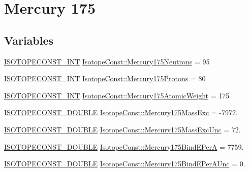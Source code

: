 \hypertarget{group___isotope_const-_mercury-_hg175}{}\section{Mercury 175}
\label{group___isotope_const-_mercury-_hg175}
\subsection*{Variables}
\begin{DoxyCompactItemize}
\item 
\mbox{\hyperlink{group___isotope_const-_macros_ga5f18360b3e99483a35c32d789e62621c}{I\+S\+O\+T\+O\+P\+E\+C\+O\+N\+S\+T\+\_\+\+I\+NT}} \mbox{\hyperlink{group___isotope_const-_mercury-_hg175_ga2373d2c730c026148d1260cc7efb0136}{Isotope\+Const\+::\+Mercury175\+Neutrons}} = 95
\item 
\mbox{\hyperlink{group___isotope_const-_macros_ga5f18360b3e99483a35c32d789e62621c}{I\+S\+O\+T\+O\+P\+E\+C\+O\+N\+S\+T\+\_\+\+I\+NT}} \mbox{\hyperlink{group___isotope_const-_mercury-_hg175_gacf30aab40cf5e2e17aad1558c3d8c1d1}{Isotope\+Const\+::\+Mercury175\+Protons}} = 80
\item 
\mbox{\hyperlink{group___isotope_const-_macros_ga5f18360b3e99483a35c32d789e62621c}{I\+S\+O\+T\+O\+P\+E\+C\+O\+N\+S\+T\+\_\+\+I\+NT}} \mbox{\hyperlink{group___isotope_const-_mercury-_hg175_gae8ffdcfcc79bc3364e020044ec38a23b}{Isotope\+Const\+::\+Mercury175\+Atomic\+Weight}} = 175
\item 
\mbox{\hyperlink{group___isotope_const-_macros_ga8f45a7272ce02c0b4c65c44636ed719a}{I\+S\+O\+T\+O\+P\+E\+C\+O\+N\+S\+T\+\_\+\+D\+O\+U\+B\+LE}} \mbox{\hyperlink{group___isotope_const-_mercury-_hg175_gae8ce7aa85851d7ccad200cb4e36c304b}{Isotope\+Const\+::\+Mercury175\+Mass\+Exc}} = -\/7972.
\item 
\mbox{\hyperlink{group___isotope_const-_macros_ga8f45a7272ce02c0b4c65c44636ed719a}{I\+S\+O\+T\+O\+P\+E\+C\+O\+N\+S\+T\+\_\+\+D\+O\+U\+B\+LE}} \mbox{\hyperlink{group___isotope_const-_mercury-_hg175_ga8499363e9d65eec051f52adea92954b3}{Isotope\+Const\+::\+Mercury175\+Mass\+Exc\+Unc}} = 72.
\item 
\mbox{\hyperlink{group___isotope_const-_macros_ga8f45a7272ce02c0b4c65c44636ed719a}{I\+S\+O\+T\+O\+P\+E\+C\+O\+N\+S\+T\+\_\+\+D\+O\+U\+B\+LE}} \mbox{\hyperlink{group___isotope_const-_mercury-_hg175_ga825669a116ccc09308a6f80302ffa518}{Isotope\+Const\+::\+Mercury175\+Bind\+E\+PerA}} = 7759.
\item 
\mbox{\hyperlink{group___isotope_const-_macros_ga8f45a7272ce02c0b4c65c44636ed719a}{I\+S\+O\+T\+O\+P\+E\+C\+O\+N\+S\+T\+\_\+\+D\+O\+U\+B\+LE}} \mbox{\hyperlink{group___isotope_const-_mercury-_hg175_ga25872a64765b6aceb51bb6df654ef014}{Isotope\+Const\+::\+Mercury175\+Bind\+E\+Per\+A\+Unc}} = 0.

\end{DoxyCompactItemize}
